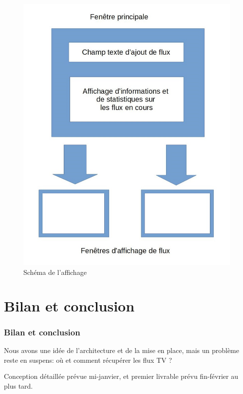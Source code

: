 \documentclass{beamer}
\begin{document}
\begin{frame}	

\begin{figure}
	\includegraphics[scale=0.25]{Rapport_PR&D/images/ihm}
	\caption{Schéma de l'affichage}
\end{figure}

\end{frame}


\section*{Bilan et conclusion}

\begin{frame}	
\frametitle{Bilan et conclusion}


Nous avons une idée de l'architecture et de la mise en place, mais un problème reste en suspens: où et comment récupérer les flux TV ? 


Conception détaillée prévue mi-janvier, et premier livrable prévu fin-février au plus tard.



\end{frame}
\end{document}
